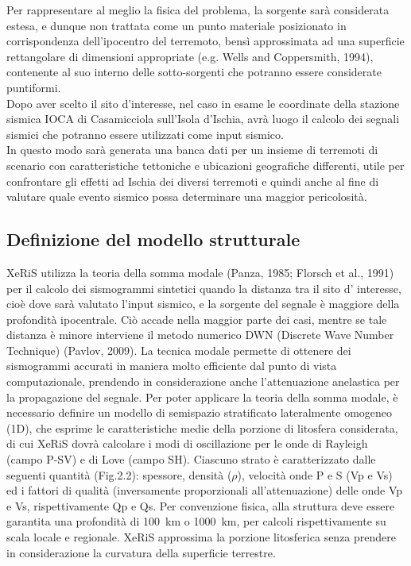 \documentclass[a4paper,12pt,titlepage]{article}
\begin{document}
Per rappresentare al meglio la fisica del problema, la sorgente sarà considerata estesa, e dunque non trattata come un punto materiale posizionato in corrispondenza dell'ipocentro del terremoto, bensì approssimata ad una superficie rettangolare di dimensioni appropriate (e.g. Wells and Coppersmith, 1994), contenente al suo interno delle sotto-sorgenti che potranno essere considerate puntiformi.\\
Dopo aver scelto il sito d'interesse, nel caso in esame le coordinate della stazione sismica IOCA di Casamicciola sull'Isola d'Ischia, avrà luogo il calcolo dei segnali sismici che potranno essere utilizzati come input sismico.\\
In questo modo sarà generata una banca dati per un insieme di terremoti di scenario con caratteristiche tettoniche e ubicazioni geografiche differenti, utile per confrontare gli effetti ad Ischia dei diversi terremoti e quindi anche al fine di valutare quale evento sismico possa determinare una maggior pericolosità.
\clearpage

\subsection{Definizione del modello strutturale}
XeRiS utilizza la teoria della somma modale (Panza, 1985; Florsch et al., 1991) per il calcolo dei sismogrammi sintetici quando la distanza tra il sito d' interesse, cioè dove sarà valutato l'input sismico, e la sorgente del segnale è maggiore della profondità ipocentrale. Ciò accade nella maggior parte dei casi, mentre se tale distanza è minore interviene il metodo numerico DWN (Discrete Wave Number Technique) (Pavlov, 2009). La tecnica modale permette di ottenere dei sismogrammi accurati in maniera molto efficiente dal punto di vista computazionale, prendendo in considerazione anche l'attenuazione anelastica per la propagazione del segnale. Per poter applicare la teoria della somma modale, è necessario definire un modello di semispazio stratificato lateralmente omogeneo (1D), che esprime le caratteristiche medie della porzione di litosfera considerata, di cui XeRiS dovrà calcolare i modi di oscillazione per le onde di Rayleigh (campo P-SV) e di Love (campo SH). Ciascuno strato è caratterizzato dalle seguenti quantità (Fig.2.2): spessore, densità ($\rho$), velocità onde P e S (Vp e Vs) ed i fattori di qualità (inversamente proporzionali all'attenuazione) delle onde Vp e Vs, rispettivamente Qp e Qs. Per convenzione fisica, alla struttura deve essere garantita una profondità di \SI{100}{\kilo\metre} o \SI{1000}{\kilo\metre}, per calcoli rispettivamente su scala locale e regionale. XeRiS approssima la porzione litosferica senza prendere in considerazione la curvatura della superficie terrestre.
\end{document}

